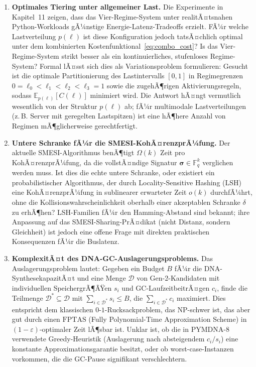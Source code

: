 ﻿\documentclass[a4paper,12pt]{article}
\theoremstyle{definition}
\begin{document}
\begin{enumerate}
  \item \textbf{Optimales Tiering unter allgemeiner Last.} Die Experimente in Kapitel~11 zeigen, dass das Vier-Regime-System unter realitÃ¤tsnahen Python-Workloads gÃ¼nstige Energie-Latenz-Tradeoffs erzielt. FÃ¼r welche Lastverteilung $p(\ell)$ ist diese Konfiguration jedoch tatsÃ¤chlich optimal unter dem kombinierten Kostenfunktional~\eqref{eq:combo_cost}? Is das Vier-Regime-System strikt besser als ein kontinuierliches, stufenloses Regime-System? Formal lÃ¤sst sich dies als Variationsproblem formulieren: Gesucht ist die optimale Partitionierung des Lastintervalls $[0,1]$ in Regimegrenzen $0 = \ell_0 < \ell_1 < \ell_2 < \ell_3 = 1$ sowie die zugehÃ¶rigen Aktivierungsregeln, sodass $\mathbb{E}_{p(\ell)}[C(\ell)]$ minimiert wird. Die Antwort hÃ¤ngt vermutlich wesentlich von der Struktur $p(\ell)$ ab; fÃ¼r multimodale Lastverteilungen (z.\,B. Server mit geregelten Lastspitzen) ist eine hÃ¶here Anzahl von Regimen mÃ¶glicherweise gerechtfertigt.

  \item \textbf{Untere Schranke fÃ¼r die SMESI-KohÃ¤renzprÃ¼fung.} Der aktuelle SMESI-Algorithmus benÃ¶tigt $\Omega(k)$ Zeit pro KohÃ¤renzprÃ¼fung, da die vollstÃ¤ndige Signatur $\boldsymbol{\sigma} \in \mathbb{F}_q^k$ verglichen werden muss. Ist dies die echte untere Schranke, oder existiert ein probabilistischer Algorithmus, der durch Locality-Sensitive Hashing (LSH) eine KohÃ¤renzprÃ¼fung in sublinearer erwarteter Zeit $o(k)$ durchfÃ¼hrt, ohne die Kollisionswahrscheinlichkeit oberhalb einer akzeptablen Schranke $\delta$ zu erhÃ¶hen? LSH-Familien fÃ¼r den Hamming-Abstand sind bekannt; ihre Anpassung auf das SMESI-Sharing-PrÃ¤dikat (nicht Distanz, sondern Gleichheit) ist jedoch eine offene Frage mit direkten praktischen Konsequenzen fÃ¼r die Buslatenz.

  \item \textbf{KomplexitÃ¤t des DNA-GC-Auslagerungsproblems.} Das Auslagerungsproblem lautet: Gegeben ein Budget $B$ fÃ¼r die DNA-SynthesekapazitÃ¤t und eine Menge $\mathcal{D}$ von Gen-2-Kandidaten mit individuellen SpeichergrÃ¶ÃŸen $s_i$ und GC-LaufzeitbeitrÃ¤gen $c_i$, finde die Teilmenge $\mathcal{D}^* \subseteq \mathcal{D}$ mit $\sum_{i \in \mathcal{D}^*} s_i \leq B$, die $\sum_{i \in \mathcal{D}^*} c_i$ maximiert. Dies entspricht dem klassischen $0$-$1$-Rucksackproblem, das NP-schwer ist, das aber gut durch einen $\mathrm{FPTAS}$ (Fully Polynomial-Time Approximation Scheme) in $(1-\varepsilon)$-optimaler Zeit lÃ¶sbar ist. Unklar ist, ob die in PYMDNA-8 verwendete Greedy-Heuristik (Auslagerung nach absteigendem $c_i/s_i$) eine konstante Approximationsgarantie besitzt, oder ob worst-case-Instanzen vorkommen, die die GC-Pause signifikant verschlechtern.


\end{enumerate}
\end{document}

